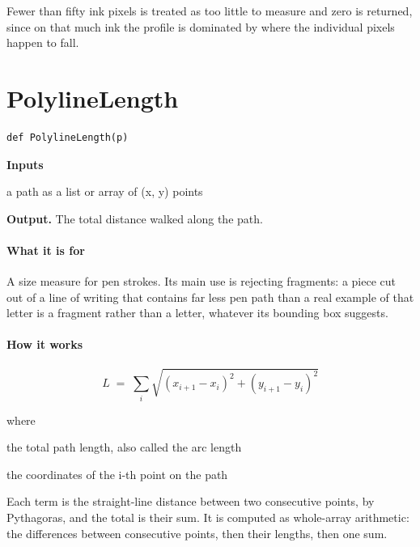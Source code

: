 Fewer than fifty ink pixels is treated as too little to measure and zero is returned, since on that much ink the profile is dominated by where the individual pixels happen to fall.


\section{PolylineLength}
\begin{lstlisting}[style=sig]
def PolylineLength(p)
\end{lstlisting}

\noindent\textbf{Inputs}
\begin{description}[leftmargin=2.2em,style=nextline,font=\normalfont\ttfamily]\setlength\itemsep{1pt}
  \item[{p}] \normalfont a path as a list or array of (x, y) points
\end{description}

\noindent\textbf{Output.} The total distance walked along the path.


\paragraph{What it is for}
A size measure for pen strokes. Its main use is rejecting fragments: a piece cut out of a line of writing that contains far less pen path than a real example of that letter is a fragment rather than a letter, whatever its bounding box suggests.


\paragraph{How it works}

\begin{equation}
L \;=\; \sum_{i} \sqrt{(x_{i+1}-x_i)^2 + (y_{i+1}-y_i)^2}
\end{equation}

\noindent where
\begin{description}[leftmargin=2.4em,style=nextline,font=\normalfont\ttfamily]\setlength\itemsep{1pt}
  \item[{$L$}] \normalfont the total path length, also called the arc length
  \item[{$x_i,\, y_i$}] \normalfont the coordinates of the i-th point on the path
\end{description}
Each term is the straight-line distance between two consecutive points, by Pythagoras, and the total is their sum. It is computed as whole-array arithmetic: the differences between consecutive points, then their lengths, then one sum.


